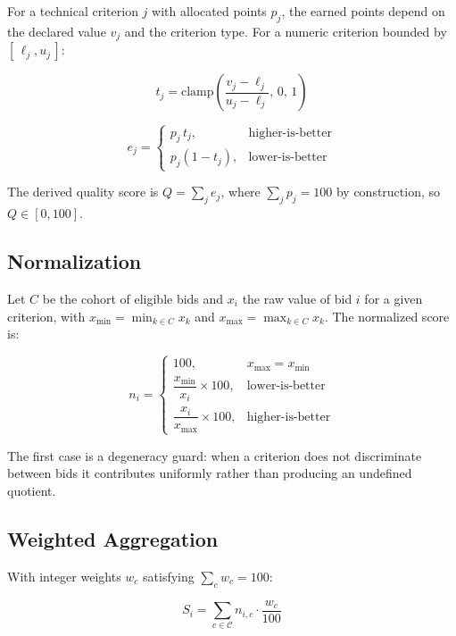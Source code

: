 \documentclass[conference]{IEEEtran}
\begin{document}
For a technical criterion $j$ with allocated points $p_j$, the earned
points depend on the declared value $v_j$ and the criterion type. For a
numeric criterion bounded by $[\,\ell_j, u_j\,]$:

\begin{equation}
t_j = \mathrm{clamp}\!\left(\frac{v_j - \ell_j}{u_j - \ell_j},\, 0,\, 1\right)
\label{eq:numeric-t}
\end{equation}

\begin{equation}
e_j =
\begin{cases}
p_j \, t_j, & \text{higher-is-better} \\[2pt]
p_j (1 - t_j), & \text{lower-is-better}
\end{cases}
\label{eq:earned}
\end{equation}

The derived quality score is $Q = \sum_j e_j$, where
$\sum_j p_j = 100$ by construction, so $Q \in [0, 100]$.

\subsection{Normalization}

Let $C$ be the cohort of eligible bids and $x_i$ the raw value of bid $i$
for a given criterion, with $x_{\min} = \min_{k \in C} x_k$ and
$x_{\max} = \max_{k \in C} x_k$. The normalized score is:

\begin{equation}
n_i =
\begin{cases}
100, & x_{\max} = x_{\min} \\[3pt]
\dfrac{x_{\min}}{x_i} \times 100, & \text{lower-is-better} \\[8pt]
\dfrac{x_i}{x_{\max}} \times 100, & \text{higher-is-better}
\end{cases}
\label{eq:normalize}
\end{equation}

The first case is a degeneracy guard: when a criterion does not
discriminate between bids it contributes uniformly rather than producing
an undefined quotient.

\subsection{Weighted Aggregation}

With integer weights $w_c$ satisfying $\sum_c w_c = 100$:

\begin{equation}
S_i = \sum_{c \in \mathcal{C}} n_{i,c} \cdot \frac{w_c}{100}
\label{eq:final}
\end{equation}
\end{document}
